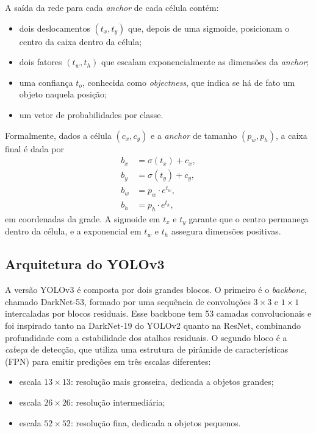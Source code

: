 \documentclass[11pt,a4paper]{article}
\begin{document}
A saída da rede para cada \textit{anchor} de cada célula contém:
\begin{itemize}\itemsep0pt
  \item dois deslocamentos $(t_x, t_y)$ que, depois de uma sigmoide, posicionam o centro da caixa dentro da célula;
  \item dois fatores $(t_w, t_h)$ que escalam exponencialmente as dimensões da \textit{anchor};
  \item uma confiança $t_o$, conhecida como \emph{objectness}, que indica se há de fato um objeto naquela posição;
  \item um vetor de probabilidades por classe.
\end{itemize}

Formalmente, dados a célula $(c_x, c_y)$ e a \textit{anchor} de tamanho $(p_w, p_h)$, a caixa final é dada por
\begin{align}
  b_x &= \sigma(t_x) + c_x, \\
  b_y &= \sigma(t_y) + c_y, \\
  b_w &= p_w \cdot e^{t_w}, \\
  b_h &= p_h \cdot e^{t_h},
\end{align}
em coordenadas da grade. A sigmoide em $t_x$ e $t_y$ garante que o centro permaneça dentro da célula, e a exponencial em $t_w$ e $t_h$ assegura dimensões positivas.

\subsection{Arquitetura do YOLOv3}

A versão YOLOv3 é composta por dois grandes blocos. O primeiro é o \emph{backbone}, chamado DarkNet-53, formado por uma sequência de convoluções $3{\times}3$ e $1{\times}1$ intercaladas por blocos residuais. Esse backbone tem 53 camadas convolucionais e foi inspirado tanto na DarkNet-19 do YOLOv2 quanto na ResNet, combinando profundidade com a estabilidade dos atalhos residuais. O segundo bloco é a \emph{cabeça} de detecção, que utiliza uma estrutura de pirâmide de características (FPN) para emitir predições em três escalas diferentes:
\begin{itemize}\itemsep0pt
  \item escala $13 \times 13$: resolução mais grosseira, dedicada a objetos grandes;
  \item escala $26 \times 26$: resolução intermediária;
  \item escala $52 \times 52$: resolução fina, dedicada a objetos pequenos.
\end{itemize}
\end{document}
